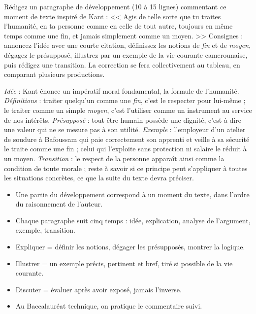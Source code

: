 \documentclass[11pt]{article}
\begin{document}
\begin{exercice}
Rédigez un paragraphe de développement (10 à 15 lignes) commentant ce moment de texte inspiré de Kant : << Agis de telle sorte que tu traites l'humanité, en ta personne comme en celle de tout autre, toujours en même temps comme une fin, et jamais simplement comme un moyen. >> Consignes : annoncez l'idée avec une courte citation, définissez les notions de \emph{fin} et de \emph{moyen}, dégagez le présupposé, illustrez par un exemple de la vie courante camerounaise, puis rédigez une transition. La correction se fera collectivement au tableau, en comparant plusieurs productions.
\end{exercice}

\begin{corrige}
\emph{Idée} : Kant énonce un impératif moral fondamental, la formule de l'humanité. \emph{Définitions} : traiter quelqu'un comme une \emph{fin}, c'est le respecter pour lui-même ; le traiter comme un simple \emph{moyen}, c'est l'utiliser comme un instrument au service de nos intérêts. \emph{Présupposé} : tout être humain possède une dignité, c'est-à-dire une valeur qui ne se mesure pas à son utilité. \emph{Exemple} : l'employeur d'un atelier de soudure à Bafoussam qui paie correctement son apprenti et veille à sa sécurité le traite comme une fin ; celui qui l'exploite sans protection ni salaire le réduit à un moyen. \emph{Transition} : le respect de la personne apparaît ainsi comme la condition de toute morale ; reste à savoir si ce principe peut s'appliquer à toutes les situations concrètes, ce que la suite du texte devra préciser.
\end{corrige}

\begin{aretenir}
\begin{itemize}
\item Une partie du développement correspond à un moment du texte, dans l'ordre du raisonnement de l'auteur.
\item Chaque paragraphe suit cinq temps : idée, explication, analyse de l'argument, exemple, transition.
\item Expliquer = définir les notions, dégager les présupposés, montrer la logique.
\item Illustrer = un exemple précis, pertinent et bref, tiré si possible de la vie courante.
\item Discuter = évaluer après avoir exposé, jamais l'inverse.
\item Au Baccalauréat technique, on pratique le commentaire suivi.
\end{itemize}
\end{aretenir}
\end{document}
